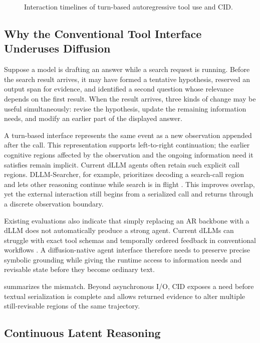 \begin{figure}[t]
  \centering
  
  \caption{Interaction timelines of turn-based autoregressive tool use and CID.}
  \label{fig:interface-timing}
\end{figure}

\subsection{Why the Conventional Tool Interface Underuses Diffusion}

Suppose a model is drafting an answer while a search request is running. Before the search result arrives, it may have formed a tentative hypothesis, reserved an output span for evidence, and identified a second question whose relevance depends on the first result. When the result arrives, three kinds of change may be useful simultaneously: revise the hypothesis, update the remaining information needs, and modify an earlier part of the displayed answer.

A turn-based interface represents the same event as a new observation appended after the call. This representation supports left-to-right continuation; the earlier cognitive regions affected by the observation and the ongoing information need it satisfies remain implicit. Current dLLM agents often retain such explicit call regions. DLLM-Searcher, for example, prioritizes decoding a search-call region and lets other reasoning continue while search is in flight \citep{zhao2026dllmsearcher}. This improves overlap, yet the external interaction still begins from a serialized call and returns through a discrete observation boundary.

Existing evaluations also indicate that simply replacing an AR backbone with a dLLM does not automatically produce a strong agent. Current dLLMs can struggle with exact tool schemas and temporally ordered feedback in conventional workflows \citep{lu2026bitterlesson}. A diffusion-native agent interface therefore needs to preserve precise symbolic grounding while giving the runtime access to information needs and revisable state before they become ordinary text.

 summarizes the mismatch. Beyond asynchronous I/O, CID exposes a need before textual serialization is complete and allows returned evidence to alter multiple still-revisable regions of the same trajectory.

\subsection{Continuous Latent Reasoning}

